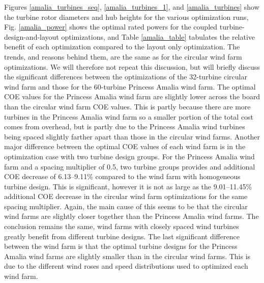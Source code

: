 Figures \ref{amalia_turbines_seq}, \ref{amalia_turbines_1},  and \ref{amalia_turbines} show the turbine rotor diameters and hub heights for the various optimization runs,  Fig. \ref{amalia_power} shows the optimal rated powers for the coupled turbine-design-and-layout optimizations, and Table \ref{amalia_table} tabulates the relative benefit of each optimization compared to the layout only optimization. The trends, and reasons behind them, are the same as for the circular wind farm optimizations. We will therefore not repeat this discussion, but will briefly discuss the significant differences between the optimizations of the 32-turbine circular wind farm and those for the 60-turbine Princess Amalia wind farm. The optimal COE values for the Princess Amalia wind farm are slightly lower across the board than the circular wind farm COE values. This is partly because there are more turbines in the Princess Amalia wind farm so a smaller portion of the total cost comes from overhead, but is partly due to the Princess Amalia wind turbines being spaced slightly farther apart than those in the circular wind farms. Another major difference between the optimal COE values of each wind farm is in the optimization case with two turbine design groups. For the Princess Amalia wind farm and a spacing multiplier of 0.5, two turbine groups provides and additional COE decrease of 6.13--9.11\% compared to the wind farm with homogeneous turbine design. This is significant, however it is not as large as the 9.01--11.45\% additional COE decrease in the circular wind farm optimizations for the same spacing multiplier. Again, the main cause of this seems to be that the circular wind farms are slightly closer together than the Princess Amalia wind farms. The conclusion remains the same, wind farms with closely spaced wind turbines greatly benefit from different turbine designs. The last significant difference between the wind farm is that the optimal turbine designs for the Princess Amalia wind farms are slightly smaller than in the circular wind farms. This is due to the different wind roses and speed distributions used to optimized each wind farm. 









